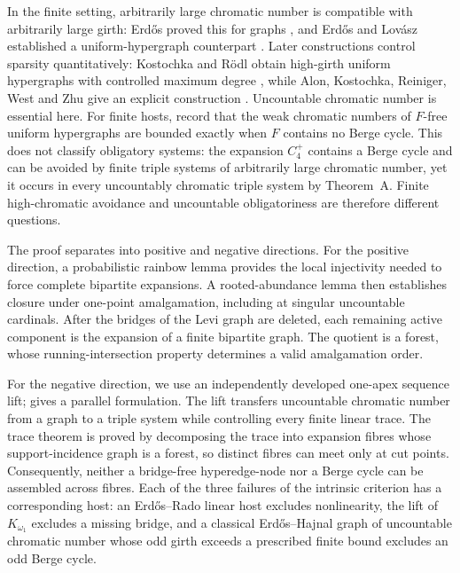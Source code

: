 \documentclass[a4paper,11pt,reqno]{amsart}
\theoremstyle{plain}
\theoremstyle{definition}
\theoremstyle{remark}
\begin{document}
In the finite setting, arbitrarily large chromatic number is compatible with
arbitrarily large girth: Erd\H{o}s proved this for graphs
\citep[pp.~35--37]{erdos1959}, and Erd\H{o}s and Lov\'asz established a
uniform-hypergraph counterpart \citep[Theorem~1$'$]{erdoslovasz1975}.
Later constructions control sparsity quantitatively: Kostochka and R{\"o}dl
obtain high-girth uniform hypergraphs with controlled maximum degree
\citep[Theorem~3]{kostochkarodl2010}, while Alon, Kostochka, Reiniger, West
and Zhu give an explicit construction \citep[Theorem~3.2]{alonetal2016}.
Uncountable chromatic number is essential here.  For finite hosts,
\citet[Proposition~1.3(ii)]{wang2026} record that the weak chromatic numbers
of $F$-free uniform hypergraphs are bounded exactly when $F$ contains no Berge
cycle.  This does not classify obligatory systems: the expansion $C_4^+$
contains a Berge cycle and can be avoided by finite triple systems of
arbitrarily large chromatic number, yet it occurs in every uncountably
chromatic triple system by Theorem~A.  Finite high-chromatic avoidance and
uncountable obligatoriness are therefore different questions.

The proof separates into positive and negative directions.  For the positive
direction, a probabilistic rainbow lemma provides the local injectivity
needed to force complete bipartite expansions.  A rooted-abundance lemma then
establishes closure under one-point amalgamation, including at singular
uncountable cardinals.  After the bridges of the Levi graph are deleted, each
remaining active component is the expansion of a finite bipartite graph.  The
quotient is a forest, whose running-intersection property determines a valid
amalgamation order.

For the negative direction, we use an independently developed one-apex
sequence lift; \citet[Sections~3--4]{li2026} gives a parallel formulation.
The lift transfers uncountable chromatic
number from a graph to a triple system while controlling every finite linear
trace.  The trace theorem is proved by decomposing the trace into expansion
fibres whose support-incidence graph is a forest, so distinct fibres can meet
only at cut points.  Consequently, neither a bridge-free hyperedge-node nor a
Berge cycle can be assembled across fibres.  Each of the three failures of
the intrinsic criterion has a corresponding host: an Erdős--Rado linear host
excludes nonlinearity, the lift of $K_{\omega_1}$ excludes a missing bridge,
and a classical Erdős--Hajnal graph of uncountable chromatic number whose odd
girth exceeds a prescribed finite bound excludes an odd Berge cycle.
\end{document}
